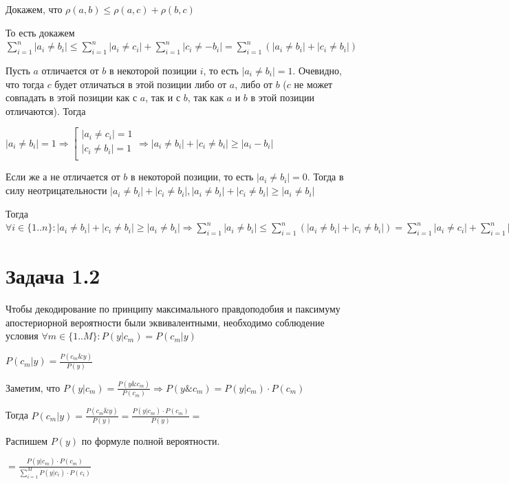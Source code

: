 \documentclass{article}
\begin{document}
	Докажем, что $\rho(a, b) \leq \rho(a, c) + \rho(b, c)$
	
	То есть докажем $\sum\limits_{i = 1}^n |a_i \neq b_i|  \leq \sum\limits_{i = 1}^n |a_i \neq c_i| + \sum\limits_{i = 1}^n |c_i\neq- b_i|  = \sum\limits_{i = 1}^n (|a_i \neq b_i| + |c_i \neq b_i|)$
	
	Пусть $a$ отличается от $b$ в некоторой позиции $i$, то есть $|a_i \neq b_i| = 1$. Очевидно, что тогда $c$ будет отличаться в этой позиции либо от $a$, либо от $b$ ($c$ не может совпадать в этой позиции как с $a$, так и с $b$, так как $a$ и $b$ в этой позиции отличаются). Тогда
	
	$|a_i \neq b_i| = 1 \Rightarrow \left[
	\begin{array}{ccc}
	|a_i \neq c_i| = 1 \\
	|c_i \neq b_i| = 1\\
	\end{array}
	\right. \Rightarrow |a_i \neq b_i| + |c_i \neq b_i|  \geq  |a_i - b_i|$
	
	Если же $а$ не отличается от $b$ в некоторой позиции, то есть $|a_i \neq b_i| = 0$. Тогда в силу неотрицательности $|a_i \neq b_i| + |c_i \neq b_i|, |a_i \neq b_i| + |c_i \neq b_i| \geq |a_i \neq b_i|$
	
	Тогда $\forall i \in \{1..n\}: |a_i \neq b_i| + |c_i \neq b_i| \geq |a_i \neq b_i| \Rightarrow \sum\limits_{i = 1}^n |a_i \neq b_i|  \leq  \sum\limits_{i = 1}^n (|a_i \neq b_i| + |c_i \neq b_i|) = \sum\limits_{i = 1}^n |a_i \neq c_i| + \sum\limits_{i = 1}^n |c_i \neq b_i| \Rightarrow \rho(a, b) \leq \rho(a, c) + \rho(b, c)$
	
	\section{Задача 1.2}
	
	Чтобы декодирование по принципу максимального правдоподобия и паксимуму апостериорной вероятности были эквивалентными, необходимо соблюдение условия $\forall m \in \{1..M\}: P(y|c_m) = P(c_m|y)$
	
	$P(c_m|y) = \frac{P(c_m \& y)}{P(y)}$
	
	Заметим, что $P(y|c_m) = \frac{P(y \& c_m)}{P(c_m)} \Rightarrow P(y\& c_m) = P(y|c_m) \cdot P(c_m)$
	
	Тогда $P(c_m|y) = \frac{P(c_m\& y)}{P(y)} = \frac{P(y|c_m) \cdot P(c_m)}{P(y)} =$
	
	Распишем $P(y)$ по формуле полной вероятности.
	
	$= \frac{P(y|c_m) \cdot P(c_m)}{\sum\limits_{i = 1}^M P(y|c_i) \cdot P(c_i)}$
	
\end{document}
